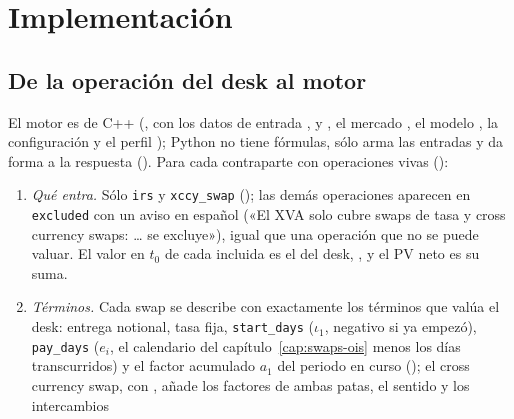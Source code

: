 \section{Implementación}\label{sec:cap14-implementacion}

\begin{sloppypar}
\subsection{De la operación del desk al motor}\label{sec:cap14-traduccion}

El motor es de C++ (, con los datos de entrada
, 
y , el mercado
, el modelo
, la configuración
 y el perfil
); Python no tiene fórmulas, sólo arma las entradas y
da forma a la respuesta (). Para cada contraparte con operaciones vivas
():
\begin{enumerate}
  \item \emph{Qué entra.} Sólo \texttt{irs} y \texttt{xccy\_swap}
        (); las demás operaciones aparecen en \texttt{excluded}
        con un aviso en español («El XVA solo cubre swaps de tasa y cross currency swaps: … se excluye»), igual que
        una operación que no se puede valuar. El valor en $t_0$ de cada incluida es el del desk,
        , y el PV neto es su suma.
  \item \emph{Términos.} Cada swap se describe con exactamente los términos que valúa el desk:
         entrega notional, tasa fija, \texttt{start\_days}
        ($\iota_1$, negativo si ya empezó), \texttt{pay\_days} ($e_i$, el calendario del capítulo~\ref{cap:swaps-ois}
        menos los días transcurridos) y el factor acumulado $a_1$ del periodo en curso
        (); el cross currency swap, con
        , añade los factores de ambas patas, el sentido y los intercambios

\end{enumerate}
\end{sloppypar}
